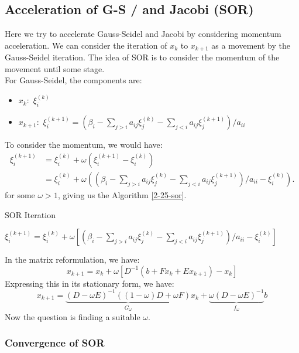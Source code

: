 \documentclass[../main/main.tex]{subfiles}
\begin{document}
\subsection{Acceleration of G-S / and Jacobi (SOR)}

Here we try to accelerate Gauss-Seidel and Jacobi by considering momentum acceleration. We can consider the iteration of $x_{k}$ to $x_{k+1}$ as a movement by the Gauss-Seidel iteration. The idea of SOR is to consider the momentum of the movement until some stage. \\

For Gauss-Seidel, the components are:
\begin{itemize}
\item  $x_{k}:$ $ \xi_{i}^{(k)}$
\item  $x_{k+1}:$ $ \xi_{i}^{(k+1)} = (\beta_{i} - \sum_{j> i} a_{ij} \xi_{j}^{(k) } - \sum_{j< i} a_{ij} \xi_{j}^{(k+1) } ) / a_{ii}$
\end{itemize}
To consider the momentum, we would have:
  \begin{align*}
 \xi_{i}^{(k+1)} &= \xi_{i}^{(k)} +\omega (\xi_{i}^{(k+1)}- \xi_{i}^{(k)})\\
  &= \xi_{i}^{(k)} +\omega \left((\beta_{i} - \sum_{j> i} a_{ij} \xi_{j}^{(k) } - \sum_{j< i} a_{ij} \xi_{j}^{(k+1) } ) / a_{ii}- \xi_{i}^{(k)}\right)
    .\end{align*} for some $\omega > 1$, giving us the Algorithm \ref{2-25-sor}.

        \begin{algorithm}[h!]
	\caption{SOR Iteration}
    \label{2-25-sor}
	\begin{algorithmic}[1]
      \State $\xi_{i}^{(k+1)} = \xi_{i}^{(k)} +\omega \left[(\beta_{i} - \sum_{j> i} a_{ij} \xi_{j}^{(k) } - \sum_{j< i} a_{ij} \xi_{j}^{(k+1) } ) / a_{ii}- \xi_{i}^{(k)}\right]$
      \EndFor
      \EndFor
	\end{algorithmic}
	\end{algorithm}

    In the matrix reformulation, we have: \[
x_{k+1} = x_{k} + \omega \left[D^{-1}(b+F x_{k}+ E x_{k+1})- x_{k}\right]
\] Expressing this in its stationary form, we have: \[
x_{k+1} = \underbrace{(D-\omega E)^{-1} \left((1-\omega)D+\omega F\right)}_{G_{\omega}} x_{k} + \underbrace{\omega (D-\omega E)^{-1}}_{f_{\omega}} b
\]
Now the question is finding a suitable $\omega$.

\subsubsection{Convergence of SOR}
\end{document}
